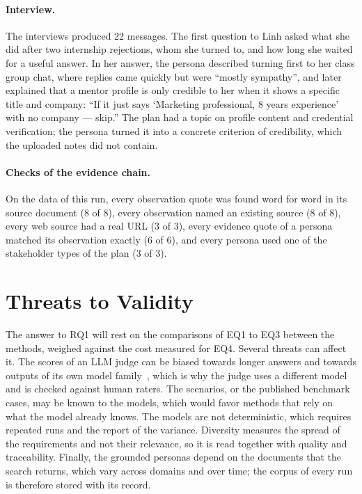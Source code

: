 \paragraph{Interview.} The interviews produced 22 messages. The first question to Linh asked what she did after two internship rejections, whom she turned to, and how long she waited for a useful answer. In her answer, the persona described turning first to her class group chat, where replies came quickly but were ``mostly sympathy'', and later explained that a mentor profile is only credible to her when it shows a specific title and company: ``If it just says `Marketing professional, 8 years experience' with no company --- skip.'' The plan had a topic on profile content and credential verification; the persona turned it into a concrete criterion of credibility, which the uploaded notes did not contain.

\paragraph{Checks of the evidence chain.} On the data of this run, every observation quote was found word for word in its source document (8 of 8), every observation named an existing source (8 of 8), every web source had a real URL (3 of 3), every evidence quote of a persona matched its observation exactly (6 of 6), and every persona used one of the stakeholder types of the plan (3 of 3).

\section{Threats to Validity}
\label{sec:eval-discussion}

The answer to RQ1 will rest on the comparisons of EQ1 to EQ3 between the methods, weighed against the cost measured for EQ4. Several threats can affect it. The scores of an LLM judge can be biased towards longer answers and towards outputs of its own model family~\cite{zheng2023judging}, which is why the judge uses a different model and is checked against human raters. The scenarios, or the published benchmark cases, may be known to the models, which would favor methods that rely on what the model already knows. The models are not deterministic, which requires repeated runs and the report of the variance. Diversity measures the spread of the requirements and not their relevance, so it is read together with quality and traceability. Finally, the grounded personas depend on the documents that the search returns, which vary across domains and over time; the corpus of every run is therefore stored with its record.
